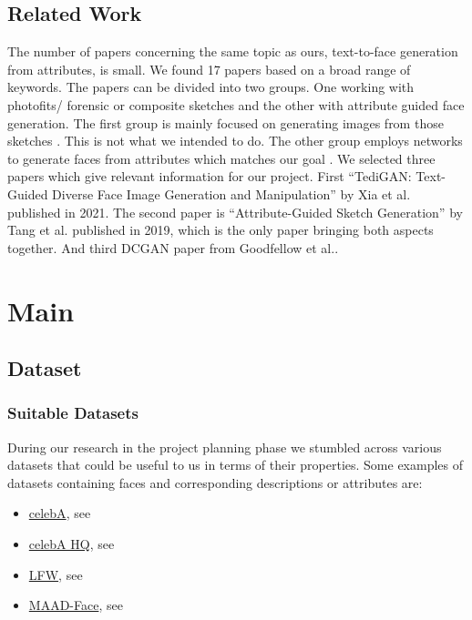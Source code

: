 \documentclass[12pt, a4paper]{article}
\begin{document}
\subsection{Related Work}
The number of papers concerning the same topic as ours, text-to-face generation from attributes, is small. We found 17 papers based on a broad range of keywords.
The papers can be divided into two groups. One working with photofits/ forensic or composite sketches and the other with attribute guided face generation.
The first group is mainly focused on generating images from those sketches \cite{6359918, LEI202013, SANNIDHAN2019452}. This is not what we intended to do. 
The other group employs networks to generate faces from attributes which matches our goal \cite{Xia_2021_CVPR,Lu_2018_ECCV,9117185,9320290,9412022,8462648,Gecer_2018_ECCV,8606936,9146375,Bodla_2018_ECCV,NIPS2016_b1301141,gauthier2014conditional,Xiao_2018_ECCV}.
We selected three papers which give relevant information for our project. First ``TediGAN: Text-Guided Diverse Face Image Generation and Manipulation'' by Xia 
et al. published in 2021\cite{Xia_2021_CVPR}. The second paper is ``Attribute-Guided Sketch Generation'' by Tang et al. published in 2019\cite{Tang}, which is 
the only paper bringing both aspects together. And third DCGAN paper from Goodfellow et al.\cite{dcgan}.

\section{Main}
\subsection{Dataset}
\subsubsection{Suitable Datasets}\label{SuitableDatasets}
During our research in the project planning phase we stumbled across various datasets that could be useful to us in
terms of their properties. Some examples of datasets containing faces and corresponding descriptions or attributes are:
\begin{itemize}
    \item \href{https://mmlab.ie.cuhk.edu.hk/projects/CelebA.html}{celebA}, see \cite{celebA}
    \item \href{http://mmlab.ie.cuhk.edu.hk/projects/CelebA/CelebAMask_HQ.html#:~:text=CelebAMask\%2DHQ\%20is\%20a\%20large,facial\%20attributes\%20corresponding\%20to\%20CelebA}{celebA HQ}, see \cite{CelebAMask-HQ}
    \item \href{http://vis-www.cs.umass.edu/lfw/}{LFW}, see \cite{LFW}
    \item \href{https://github.com/pterhoer/MAAD-Face}{MAAD-Face}, see \cite{DBLP2}
\end{itemize}
\end{document}
